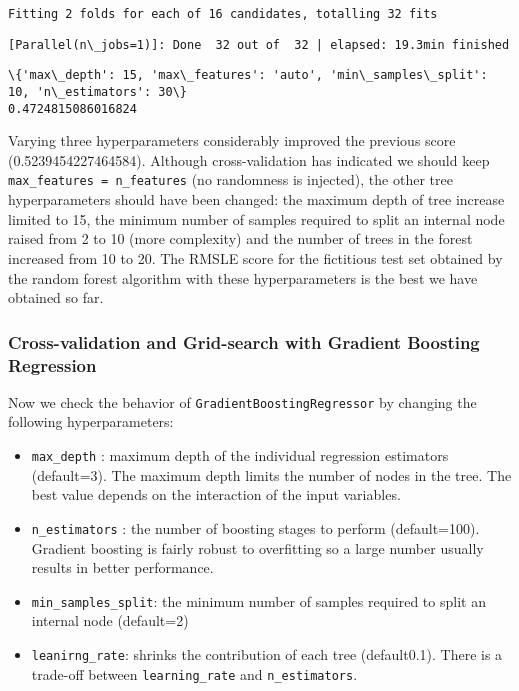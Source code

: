\documentclass[11pt]{article}
\providecommand{\tightlist}{%
      \setlength{\itemsep}{0pt}\setlength{\parskip}{0pt}}
\begin{document}
{    \begin{Verbatim}[commandchars=\\\{\}]
Fitting 2 folds for each of 16 candidates, totalling 32 fits
    \end{Verbatim}

    \begin{Verbatim}[commandchars=\\\{\}]
[Parallel(n\_jobs=1)]: Done  32 out of  32 | elapsed: 19.3min finished
    \end{Verbatim}

    \begin{Verbatim}[commandchars=\\\{\}]
\{'max\_depth': 15, 'max\_features': 'auto', 'min\_samples\_split': 10, 'n\_estimators': 30\}
0.4724815086016824
    \end{Verbatim}

    Varying three hyperparameters considerably improved the previous score
(0.5239454227464584). Although cross-validation has indicated we should
keep \texttt{max\_features\ =\ n\_features} (no randomness is injected),
the other tree hyperparameters should have been changed: the maximum
depth of tree increase limited to 15, the minimum number of samples
required to split an internal node raised from 2 to 10 (more complexity)
and the number of trees in the forest increased from 10 to 20. The RMSLE
score for the fictitious test set obtained by the random forest
algorithm with these hyperparameters is the best we have obtained so
far.

\subsubsection{Cross-validation and Grid-search with Gradient Boosting
Regression}\label{cross-validation-and-grid-search-with-gradient-boosting-regression}

\hspace{0.5cm} Now we check the behavior of \texttt{GradientBoostingRegressor} by
changing the following hyperparameters:

\begin{itemize}
\tightlist
\item
  \texttt{max\_depth} : maximum depth of the individual regression
  estimators (default=3). The maximum depth limits the number of nodes
  in the tree. The best value depends on the interaction of the input
  variables.
\item
  \texttt{n\_estimators} : the number of boosting stages to perform
  (default=100). Gradient boosting is fairly robust to overfitting so a
  large number usually results in better performance.
\item
  \texttt{min\_samples\_split}: the minimum number of samples required
  to split an internal node (default=2)
\item
  \texttt{leanirng\_rate}: shrinks the contribution of each tree
  (default0.1). There is a trade-off between \texttt{learning\_rate} and
  \texttt{n\_estimators}.
\end{itemize}

}
\end{document}

